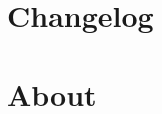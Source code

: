 \documentclass[letterpaper,10pt,english]{sphinxmanual}
\begin{document}
\chapter{Changelog}
\label{\detokenize{index:changelog}}

\chapter{About}
\label{\detokenize{index:about}}

\renewcommand{\indexname}{Python Module Index}
\begin{sphinxtheindex}
\let\bigletter\sphinxstyleindexlettergroup
\bigletter{h}
\item\relax{}
\end{sphinxtheindex}

\renewcommand{\indexname}{Index}
\printindex
\end{document}
